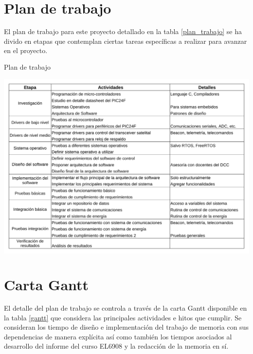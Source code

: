 \documentclass[11pt,letterpaper]{article}
\begin{document}
\newpage
\section{Plan de trabajo}

El plan de trabajo para este proyecto detallado en la tabla \ref{plan_trabajo} se ha divido en etapas que contemplan ciertas tareas específicas a realizar para avanzar en el proyecto.

\begin{table}[!ht]
\centering
\caption{Plan de trabajo} \label{plan_trabajo}
\includegraphics[width=\textwidth]{img/plan_trabajo.pdf}
\end{table}

\section{Carta Gantt}

El detalle del plan de trabajo se controla a través de la carta Gantt disponible en la tabla \ref{gantt} que considera las principales actividades e hitos que cumplir. Se consideran los tiempo de diseño e implementación del trabajo de memoria con sus dependencias de manera explícita así como también los tiempos asociados al desarrollo del informe del curso EL6908 y la redacción de la memoria en sí.
\end{document}
